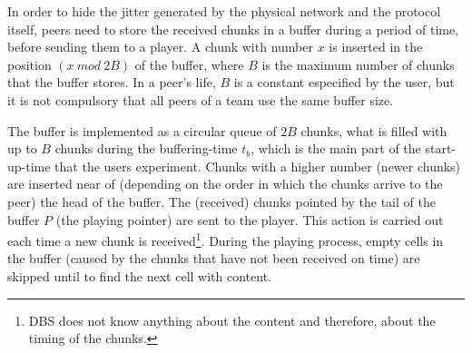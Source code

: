 

\label{sec:buffering_chunks}

In order to hide the jitter generated by the physical network and the
protocol itself, peers need to store the received chunks in a buffer
during a period of time, before sending them to a player. A chunk with
number $x$ is inserted in the position $(x~\mathit{mod}~2B)$ of the
buffer, where $B$ is the maximum number of chunks that the buffer
stores. In a peer's life, $B$ is a constant especified by the user,
but it is not compulsory that all peers of a team use the same buffer
size.

The buffer is implemented as a circular queue of $2B$ chunks, what is
filled with up to $B$ chunks during the \gls{buffering-time} $t_b$,
which is the main part of the \gls{start-up-time} that the users
experiment. Chunks with a higher number (newer chunks) are inserted
near of (depending on the order in which the chunks arrive to the
peer) the head of the buffer. The (received) chunks pointed by the tail
of the buffer $P$ (the playing pointer) are sent to the player. This
action is carried out each time a new chunk is received\footnote{DBS
  does not know anything about the content and therefore, about the
  timing of the chunks.}. During the playing process, empty cells in
the buffer (caused by the chunks that have not been received on time)
are skipped until to find the next cell with content.

